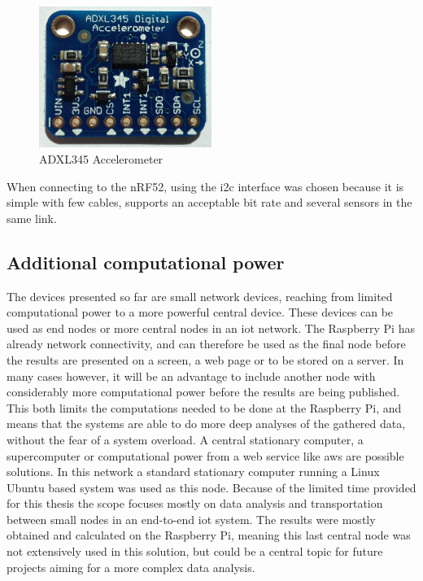 

\begin{figure}[ht]
    \centering
    \includegraphics[width=0.5\textwidth]{adxl345imagge}    
    \caption{ADXL345 Accelerometer}
    \label{fig:adxl345}
\end{figure}

\noindent When connecting to the \gls{nRF52}, using the \gls{i2c} interface was chosen because it is simple with few cables, supports an acceptable bit rate and several sensors in the same link. 

\subsection{Additional computational power}

\noindent The devices presented so far are small network devices, reaching from limited computational power to a more powerful central device. These devices can be used as end nodes or more central nodes in an \gls{iot} network. The Raspberry Pi has already network connectivity, and can therefore be used as the final node before the results are presented on a screen, a web page or to be stored on a server. In many cases however, it will be an advantage to include another node with considerably more computational power before the results are being published. This both limits the computations needed to be done at the Raspberry Pi, and means that the systems are able to do more deep analyses of the gathered data, without the fear of a system overload. A central stationary computer, a supercomputer or computational power from a web service like \gls{aws} are possible solutions. In this network a standard stationary computer running a Linux Ubuntu based system was used as this node. Because of the limited time provided for this thesis the scope focuses mostly on data analysis and transportation between small nodes in an end-to-end \gls{iot} system. The results were mostly obtained and calculated on the Raspberry Pi, meaning this last central node was not extensively used in this solution, but could be a central topic for future projects aiming for a more complex data analysis. 

